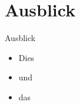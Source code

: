 \section{Ausblick}

\begin{frame}{Ausblick}
    \begin{itemize}
        \item Dies
        \item und
        \item das
    \end{itemize}
\end{frame}